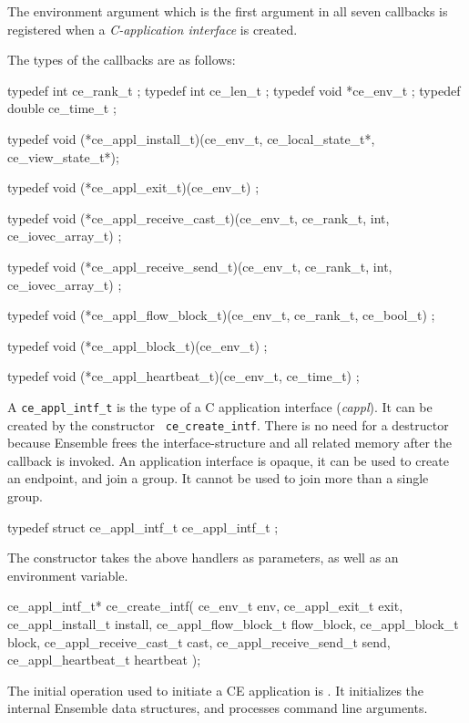 The environment argument which is the first argument in all seven
callbacks is registered when a {\it C-application interface} is created.

The types of the callbacks are as follows:
\begin{codebox}
typedef int         ce_rank_t ;
typedef int         ce_len_t ;
typedef void       *ce_env_t ;
typedef double      ce_time_t ;

typedef void (*ce_appl_install_t)(ce_env_t, ce_local_state_t*, ce_view_state_t*);

typedef void (*ce_appl_exit_t)(ce_env_t) ;

typedef void (*ce_appl_receive_cast_t)(ce_env_t, ce_rank_t, int, ce_iovec_array_t) ;

typedef void (*ce_appl_receive_send_t)(ce_env_t, ce_rank_t, int, ce_iovec_array_t) ;

typedef void (*ce_appl_flow_block_t)(ce_env_t, ce_rank_t, ce_bool_t) ;

typedef void (*ce_appl_block_t)(ce_env_t) ;

typedef void (*ce_appl_heartbeat_t)(ce_env_t, ce_time_t) ;
\end{codebox}


A {\tt ce\_appl\_intf\_t} is the type of a C application interface
({\it cappl}).  It can be created by the constructor {\tt
ce\_create\_intf}. There is no need for a destructor because Ensemble
frees the interface-structure and all related memory after the 
callback is invoked. An application interface is opaque, it can be
used to create an endpoint, and join a group. It cannot be used to 
join more than a single group.
\begin{codebox}
typedef struct ce_appl_intf_t ce_appl_intf_t ;
\end{codebox}


The constructor takes the above handlers as parameters, as well as
an environment variable. 

\begin{codebox}
ce_appl_intf_t*
ce_create_intf(
    ce_env_t env, 
    ce_appl_exit_t exit,
    ce_appl_install_t install,
    ce_appl_flow_block_t flow_block,
    ce_appl_block_t block,
    ce_appl_receive_cast_t cast,
    ce_appl_receive_send_t send,
    ce_appl_heartbeat_t heartbeat
);
\end{codebox}

The initial operation used to initiate a CE application is
. It initializes the internal Ensemble data structures, and
processes command line arguments.

